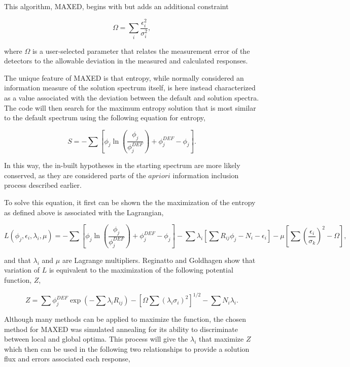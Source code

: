 This algorithm, MAXED, begins with  but adds an additional constraint

\begin{equation}
\label{eqn:maxed-omega}
\Omega = \sum_i \frac{\epsilon_i^2}{\sigma_i^2} ,
\end{equation}

\noindent
where $\Omega$ is a user-selected parameter that relates the measurement error of the detectors to the allowable deviation in the measured and calculated responses.

The unique feature of MAXED is that entropy, while normally considered an information measure of the solution spectrum itself, is here instead characterized as a value associated with the deviation between the default and solution spectra.
The code will then search for the maximum entropy solution that is most similar to the default spectrum using the following equation for entropy,

\begin{equation}
\label{eqn:maxed-skilling}
S = - \sum [\phi_j \ln (\frac{\phi_j}{\phi_j^{DEF}}) + \phi_j^{DEF} - \phi_j] .
\end{equation}

In this way, the in-built hypotheses in the starting spectrum are more likely conserved, as they are considered parts of the $a priori$ information inclusion process described earlier.

To solve this equation, it first can be shown the the maximization of the entropy as defined above is associated with the Lagrangian,

\begin{equation}
\label{eqn:maxed-lagrangian}
L(\phi_j, \epsilon_i, \lambda_i, \mu) = -\sum [\phi_j \ln (\frac{\phi_j}{\phi_j^{DEF}}) + \phi_j^{DEF} - \phi_j] - \sum \lambda_i [\sum R_{ij} \phi_j - N_i - \epsilon_i] - \mu [\sum (\frac{\epsilon_i}{\sigma_k})^2 - \Omega] ,
\end{equation}

and that $\lambda_i$ and $\mu$ are Lagrange multipliers.
Reginatto and Goldhagen show that variation of $L$ is equivalent to the maximization of the following potential function, $Z$,

\begin{equation}
\label{eqn:maxed-potential}
Z = \sum \phi_j^{DEF} \exp(-\sum \lambda_i R_{ij}) - [\Omega \sum (\lambda_i \sigma_i)^2]^{1/2} - \sum N_i \lambda_i .
\end{equation}

Although many methods can be applied to maximize the function, the chosen method for MAXED was simulated annealing for its ability to discriminate between local and global optima.
This process will give the $\lambda_i$ that maximize $Z$ which then can be used in the following two relationships to provide a solution flux and errors associated each response,


